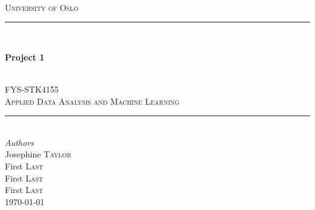 \begin{titlepage}

\newcommand{\HRule}{\rule{\linewidth}{0.5mm}} %
\setlength{\topmargin}{0in}
\center %
 

\hspace{4cm}\\ 
\textsc{\LARGE University of Oslo}\\[2.5cm] %
\HRule \\[0.4cm]
{ \huge \bfseries  Project 1\par}\\[0.7cm]
\textsc{\Large FYS-STK4155}\\[0.2cm] %
\textsc{\large Applied Data Analysis and Machine Learning}\\[0.2cm] %
\vspace{0.4cm}
    \HRule \\[1.5cm]

  

\emph{Authors}\\ [0.2cm]
Josephine \textsc{Taylor} \\ %
First \textsc{Last} \\
First \textsc{Last} \\
First \textsc{Last} \\[5cm]


{\large \today}\\[0.5cm] %


\vfill %

\end{titlepage}